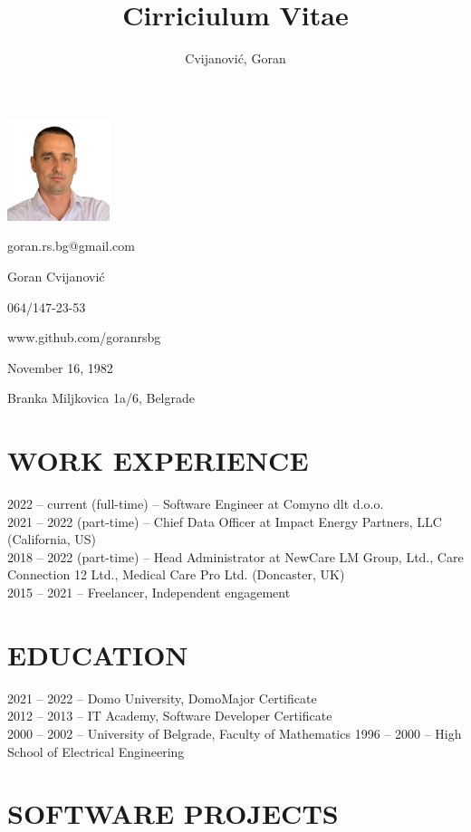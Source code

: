 \documentclass{article}
\author{ Cvijanović, Goran}
\title{Cirriciulum Vitae}
\begin{document}
\includegraphics[width=1.17917in,height=1.17778in]{img/photo.png}

\textbar{} goran.rs.bg@gmail.com

\textbar{} Goran Cvijanović

\textbar{} 064/147-23-53

\textbar{} www.github.com/goranrsbg

\textbar{} November 16, 1982

\textbar{} Branka Miljkovica 1a/6, Belgrade

\section{WORK EXPERIENCE}

2022 -- current (full-time) -- Software Engineer at Comyno dlt d.o.o.\\
2021 -- 2022 (part-time) -- Chief Data Officer at Impact Energy
Partners, LLC (California, US)\\
2018 -- 2022 (part-time) -- Head Administrator at NewCare LM Group,
Ltd., Care Connection 12 Ltd., Medical Care Pro Ltd. (Doncaster, UK)\\
2015 -- 2021 -- Freelancer, Independent engagement

\section{EDUCATION}

2021 -- 2022 -- Domo University, DomoMajor Certificate\\
2012 -- 2013 -- IT Academy, Software Developer Certificate\\
2000 -- 2002 -- University of Belgrade, Faculty of Mathematics 
1996 -- 2000 -- High School of Electrical Engineering

\section{SOFTWARE PROJECTS}
\end{document}
